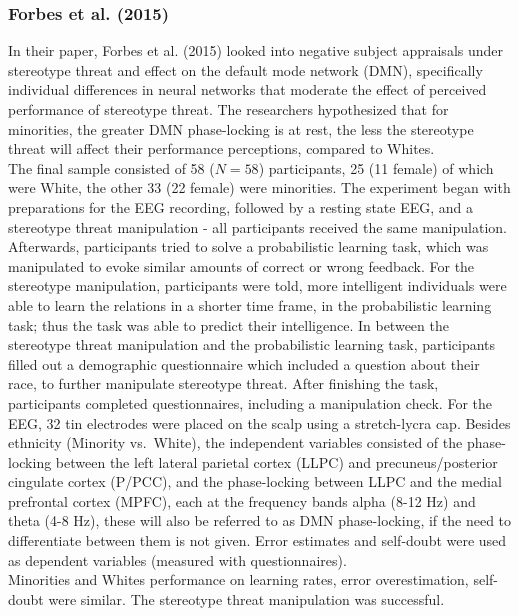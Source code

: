 \documentclass[
  stu,floatsintext]{apa7}
\begin{document}
\subsubsection{Forbes et al. (2015)}\label{forbesspontaneousdefaultmode2015}

In their paper, Forbes et al. (2015) looked into negative subject appraisals under stereotype threat and effect on the default mode network (DMN), specifically individual differences in neural networks that moderate the effect of perceived performance of stereotype threat.
The researchers hypothesized that for minorities, the greater DMN phase-locking is at rest, the less the stereotype threat will affect their performance perceptions, compared to Whites.\\
The final sample consisted of 58 (\(N = 58\)) participants, 25 (11 female) of which were White, the other 33 (22 female) were minorities.
The experiment began with preparations for the EEG recording, followed by a resting state EEG, and a stereotype threat manipulation - all participants received the same manipulation.
Afterwards, participants tried to solve a probabilistic learning task, which was manipulated to evoke similar amounts of correct or wrong feedback.
For the stereotype manipulation, participants were told, more intelligent individuals were able to learn the relations in a shorter time frame, in the probabilistic learning task; thus the task was able to predict their intelligence.
In between the stereotype threat manipulation and the probabilistic learning task, participants filled out a demographic questionnaire which included a question about their race, to further manipulate stereotype threat.
After finishing the task, participants completed questionnaires, including a manipulation check.
For the EEG, 32 tin electrodes were placed on the scalp using a stretch-lycra cap.
Besides ethnicity (Minority vs.~White), the independent variables consisted of the phase-locking between the left lateral parietal cortex (LLPC) and precuneus/posterior cingulate cortex (P/PCC), and the phase-locking between LLPC and the medial prefrontal cortex (MPFC), each at the frequency bands alpha (8-12 Hz) and theta (4-8 Hz), these will also be referred to as DMN phase-locking, if the need to differentiate between them is not given.
Error estimates and self-doubt were used as dependent variables (measured with questionnaires).\\
Minorities and Whites performance on learning rates, error overestimation, self-doubt were similar.
The stereotype threat manipulation was successful.
\end{document}
